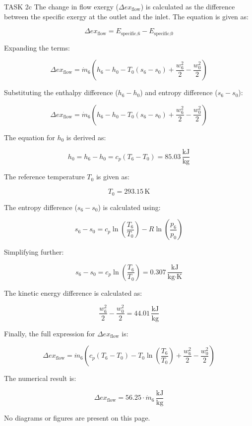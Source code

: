 TASK 2c  
The change in flow exergy (\( \Delta ex_{\text{flow}} \)) is calculated as the difference between the specific exergy at the outlet and the inlet. The equation is given as:  

\[
\Delta ex_{\text{flow}} = E_{\text{specific,6}} - E_{\text{specific,0}}
\]

Expanding the terms:  

\[
\Delta ex_{\text{flow}} = \dot{m}_6 \left( h_6 - h_0 - T_0 (s_6 - s_0) + \frac{w_6^2}{2} - \frac{w_0^2}{2} \right)
\]

Substituting the enthalpy difference (\( h_6 - h_0 \)) and entropy difference (\( s_6 - s_0 \)):  

\[
\Delta ex_{\text{flow}} = \dot{m}_6 \left( h_6 - h_0 - T_0 (s_6 - s_0) + \frac{w_6^2}{2} - \frac{w_0^2}{2} \right)
\]

The equation for \( h_0 \) is derived as:  

\[
h_0 = h_6 - h_0 = c_p (T_6 - T_0) = 85.03 \, \frac{\text{kJ}}{\text{kg}}
\]

The reference temperature \( T_0 \) is given as:  

\[
T_0 = 293.15 \, \text{K}
\]

The entropy difference (\( s_6 - s_0 \)) is calculated using:  

\[
s_6 - s_0 = c_p \ln \left( \frac{T_6}{T_0} \right) - R \ln \left( \frac{p_6}{p_0} \right)
\]

Simplifying further:  

\[
s_6 - s_0 = c_p \ln \left( \frac{T_6}{T_0} \right) = 0.307 \, \frac{\text{kJ}}{\text{kg·K}}
\]

The kinetic energy difference is calculated as:  

\[
\frac{w_6^2}{2} - \frac{w_0^2}{2} = 44.01 \, \frac{\text{kJ}}{\text{kg}}
\]

Finally, the full expression for \( \Delta ex_{\text{flow}} \) is:  

\[
\Delta ex_{\text{flow}} = \dot{m}_6 \left( c_p (T_6 - T_0) - T_0 \ln \left( \frac{T_6}{T_0} \right) + \frac{w_6^2}{2} - \frac{w_0^2}{2} \right)
\]

The numerical result is:  

\[
\Delta ex_{\text{flow}} = 56.25 \cdot \dot{m}_6 \, \frac{\text{kJ}}{\text{kg}}
\]  

No diagrams or figures are present on this page.